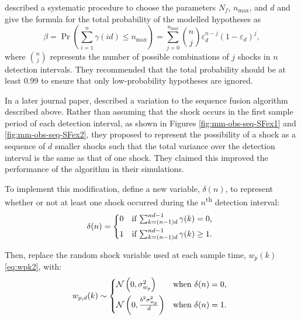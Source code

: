 {\cite{robertson_detection_1995} described a systematic procedure to choose the parameters $N_f$, $n_\text{max}$, and $d$ and give the formula for the total probability of the modelled hypotheses as
\begin{equation} \label{eq:p_gamma}
	\beta=\operatorname{Pr}\left(\sum_{i=1}^{n} \gamma(i d) \leq n_\text{max} \right) = \sum_{j=0}^{n_\text{max}} \binom{n}{j} \varepsilon_d^{n-j}(1-\varepsilon_d)^{j},
\end{equation}
%
where $\binom{n}{j}$ represents the number of possible combinations of $j$ shocks in $n$ detection intervals. They recommended that the total probability should be at least 0.99 to ensure that only low-probability hypotheses are ignored.

In a later journal paper, \cite{robertson_method_1998} described a variation to the sequence fusion algorithm described above.  Rather than assuming that the shock occurs in the first sample period of each detection interval, as shown in Figures \ref{fig:mm-obs-seq-SFex1} and \ref{fig:mm-obs-seq-SFex2}, they proposed to represent the possibility of a shock as a sequence of $d$ smaller shocks such that the total variance over the detection interval is the same as that of one shock. They claimed this improved the performance of the algorithm in their simulations.

To implement this modification, define a new variable, $\delta(n)$, to represent whether or not at least one shock occurred during the $n$\textsuperscript{th} detection interval:
\begin{equation} \label{eq:deltak}
	\delta(n) = \begin{cases*}
		0 & \text{if} $\sum_{k=(n-1) d}^{n d - 1}{\gamma(k)} = 0$, \\
		1 & \text{if} $\sum_{k=(n-1) d}^{n d - 1}{\gamma(k)} \ge 1$.
	\end{cases*}
\end{equation}

Then, replace the random shock variable used at each sample time, $w_p(k)$ \eqref{eq:wpk2}, with:
\begin{equation} \label{eq:wpdk}
	w_{p,d}(k) \sim 
	\begin{cases*}
		\mathcal{N}\left(0, \sigma_{w_p}^2\right) & \text{when} $\delta(n) = 0$, \\
		\mathcal{N}\left(0, \frac{b^2\sigma_{w_p}^2}{d}\right) & \text{when} $\delta(n) = 1$.
	\end{cases*}
\end{equation}

}
